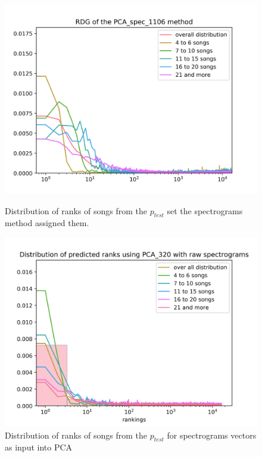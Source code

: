 \begin{figure}[hbt!]
\centering
\begin{minipage}{.5\textwidth}
  \centering
  \includegraphics[width=1\linewidth]{./img/pca_spec_1106_graph.png}
  \caption{Distribution of ranks of songs from the $p_{test}$ set the spectrograms method assigned them.}
  \label{fig:pca_spec_1106_distribution}
\end{minipage}%
\begin{minipage}{.5\textwidth}
  \centering
  \includegraphics[width=1\linewidth]{./img/pca_spec_320_graph.png}
  \caption{Distribution of ranks of songs from the $p_{test}$ for spectrograms vectors as input into PCA}
  \label{fig:pca_spec_320_distribution}
\end{minipage}
\end{figure}

